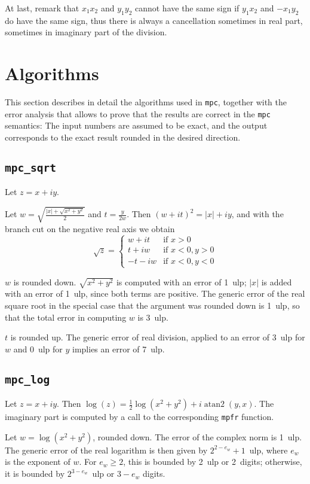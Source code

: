 \documentclass {article}
\newcommand {\mpc}{\texttt {mpc}}
\newcommand {\mpfr}{\texttt {mpfr}}
\newcommand {\ulp}[1]{#1~ulp}
\newcommand {\atantwo}{\operatorname {atan2}}
\begin{document}
At last, remark that $x_1x_2$ and $y_1y_2$ cannot have the same sign if
$y_1x_2$ and $-x_1y_2$ do have the same sign, thus there is always a
cancellation sometimes in real part, sometimes in imaginary part of the
division.


\section {Algorithms}

This section describes in detail the algorithms used in \mpc, together with the error analysis that allows to prove that the results are correct in the {\mpc} semantics: The input numbers are assumed to be exact, and the output corresponds to the exact result rounded in the desired direction.


\subsection {\texttt {mpc\_sqrt}}

Let $z = x + i y$.

Let $w = \sqrt { \frac {|x| + \sqrt {x^2 + y^2}}{2}}$ and
$t = \frac {y}{2w}$. Then $(w + it)^2 = |x| + iy$, and with the branch cut on the negative real axis we obtain
\[
\sqrt z = \left\{
\begin {array}{cl}
w + i t & \text {if } x > 0 \\
t + i w & \text {if } x < 0, y > 0 \\
-t - i w & \text {if } x < 0, y < 0
\end {array}
\right.
\]

$w$ is rounded down. $\sqrt {x^2 + y^2}$ is computed with an error of \ulp{1}; $|x|$ is added with an error of \ulp{1}, since both terms are positive. The generic error of the real square root in the special case that the argument was rounded down is \ulp{1}, so that the total error in computing $w$ is \ulp{3}.

$t$ is rounded up. The generic error of real division, applied to an error of \ulp{3} for $w$ and \ulp{0} for $y$ implies an error of \ulp{7}.


\subsection {\texttt {mpc\_log}}

Let $z = x + i y$. Then $\log (z) = \frac {1}{2} \log (x^2 + y^2) + i \atantwo (y, x)$. The imaginary part is computed by a call to the corresponding {\mpfr} function.

Let $w = \log (x^2 + y^2)$, rounded down. The error of the complex norm is \ulp{1}. The generic error of the real logarithm is then given by \ulp{$2^{2 - e_w} + 1$}, where $e_w$ is the exponent of $w$. For $e_w \geq 2$, this is bounded by \ulp{2} or 2~digits; otherwise, it is bounded by \ulp{$2^{3 - e_w}$} or $3 - e_w$ digits.
\end{document}
